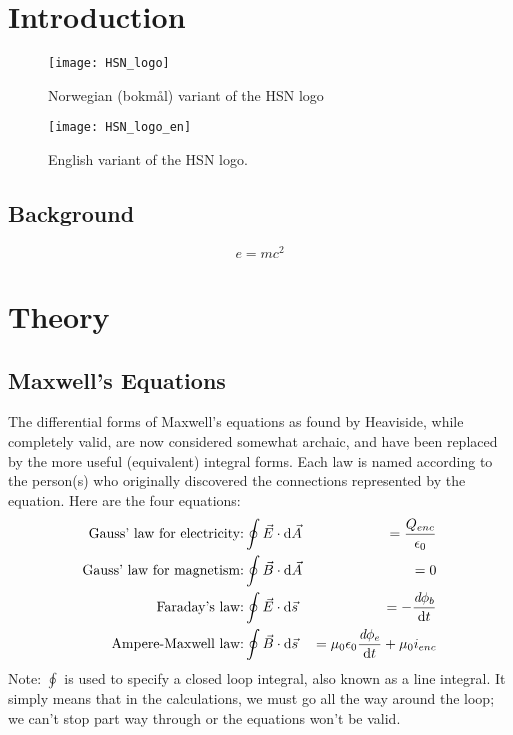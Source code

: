 \documentclass[%
    norsk,  %
]{USN-BSc}
\begin{document}
\chapter{Introduction}
\label{ch:intro}


\lipsum[4]
\begin{figure}[!ht]
  \centering
  \texttt{[image: HSN\_logo]}
  \caption{Norwegian (bokmål) variant of the HSN logo}
  \label{fig:hsn-logo}
\end{figure}
\lipsum[4]
\begin{figure}[!ht]
  \centering
  \texttt{[image: HSN\_logo\_en]}
  \caption{English variant of the HSN logo.}
  \label{fig:hsn-logo-en}
\end{figure}
\lipsum



\section{Background}
\label{sec:back}
\lipsum[4]
\begin{equation}
  e = m c^2
\end{equation}
\lipsum

\chapter{Theory}
\label{ch:theory}

\section{Maxwell's Equations}
\label{sec:theory}
\indent The differential forms of Maxwell's equations as found by Heaviside, while completely valid, are now considered somewhat archaic, and have been replaced by the more useful (equivalent) integral forms. Each law is named according to the person(s) who originally discovered the connections represented by the equation. Here are the four equations:
\begin{eqnarray}
  \text{Gauss' law for electricity:}& \displaystyle \oint{\vec{E}\cdot\mathrm{d}\vec{A}}&=\frac{Q_{enc}}{\epsilon_0}\\
  \text{Gauss' law for magnetism:}& \displaystyle \oint{\vec{B}\cdot\mathrm{d}\vec{A}}&=0\\
  \text{Faraday's law:}& \displaystyle\oint{\vec{E}\cdot\mathrm{d}\vec{s}}&=-\frac{\emph{d}\phi_b}{\mathrm{d}t}\\
  \text{Ampere-Maxwell law:}& \displaystyle\oint{\vec{B}\cdot\mathrm{d}\vec{s}}&=\mu_0\epsilon_0\frac{\emph{d}\phi_e}{\mathrm{d}t}+\mu_0 i_{enc}
\end{eqnarray}
Note: $\oint$ is used to specify a closed loop integral, also known as a line integral. It simply means that in the calculations, we must go all the way around the loop; we can't stop part way through or the equations won't be valid.
\end{document}
